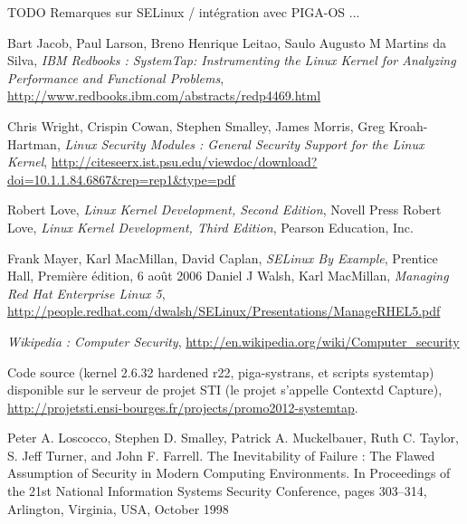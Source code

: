 \documentclass[pdftex,a4paper,titlepage,11pt]{article}
\begin{document}
TODO Remarques sur SELinux / intégration avec PIGA-OS ...


\newpage

\begin{thebibliography}{40}

 Bart Jacob, Paul Larson, Breno Henrique Leitao, Saulo Augusto M Martins da Silva, \textit{IBM Redbooks : SystemTap: Instrumenting the Linux Kernel for Analyzing Performance and Functional Problems}, \url{http://www.redbooks.ibm.com/abstracts/redp4469.html}

 Chris Wright, Crispin Cowan, Stephen Smalley, James Morris, Greg Kroah-Hartman, \textit{Linux Security Modules : General Security Support for the Linux Kernel}, \url{http://citeseerx.ist.psu.edu/viewdoc/download?doi=10.1.1.84.6867&rep=rep1&type=pdf}

 Robert Love, \textit{Linux Kernel Development, Second Edition}, Novell Press
 Robert Love, \textit{Linux Kernel Development, Third Edition}, Pearson Education, Inc.

 Frank Mayer, Karl MacMillan, David Caplan, \textit{SELinux By Example}, Prentice Hall, Première édition, 6 août 2006
 Daniel J Walsh, Karl MacMillan, \textit{Managing Red Hat Enterprise Linux 5}, \url{http://people.redhat.com/dwalsh/SELinux/Presentations/ManageRHEL5.pdf}

 \textit{Wikipedia : Computer Security}, \url{http://en.wikipedia.org/wiki/Computer_security}

 Code source (kernel 2.6.32 hardened r22, piga-systrans, et scripts systemtap) disponible sur le serveur de projet STI (le projet s'appelle Contextd Capture), \url{http://projetsti.ensi-bourges.fr/projects/promo2012-systemtap}.

 Peter A. Loscocco, Stephen D. Smalley, Patrick A. Muckelbauer, Ruth C. Taylor, S. Jeff Turner, and John F. Farrell. The Inevitability of Failure : The Flawed Assumption of Security in Modern Computing Environments. In Proceedings of the 21st National Information Systems Security Conference, pages 303–314, Arlington, Virginia, USA, October 1998


\end{thebibliography}
\end{document}
